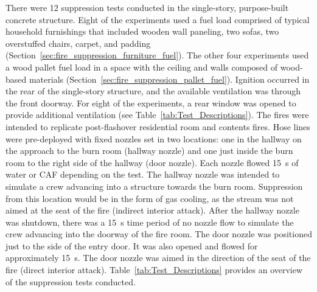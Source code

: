 \documentclass[12pt,oneside]{book}
\begin{document}
There were 12 suppression tests conducted in the single-story, purpose-built concrete structure. Eight of the experiments used a fuel load comprised of typical household furnishings that included wooden wall paneling, two sofas, two overstuffed chairs, carpet, and padding (Section~\ref{sec:fire_suppression_furniture_fuel}). The other four experiments used a wood pallet fuel load in a space with the ceiling and walls composed of wood-based materials (Section~\ref{sec:fire_suppression_pallet_fuel}). Ignition occurred in the rear of the single-story structure, and the available ventilation was through the front doorway. For eight of the experiments, a rear window was opened to provide additional ventilation (see Table~\ref{tab:Test_Descriptions}). The fires were intended to replicate post-flashover residential room and contents fires. Hose lines were pre-deployed with fixed nozzles set in two locations: one in the hallway on the approach to the burn room (hallway nozzle) and one just inside the burn room to the right side of the hallway (door nozzle). Each nozzle flowed 15~s of water or CAF depending on the test. The hallway nozzle was intended to simulate a crew advancing into a structure towards the burn room. Suppression from this location would be in the form of gas cooling, as the stream was not aimed at the seat of the fire (indirect interior attack).  After the hallway nozzle was shutdown, there was a 15~s time period of no nozzle flow to simulate the crew advancing into the doorway of the fire room. The door nozzle was positioned just to the side of the entry door.  It was also opened and flowed for approximately 15~s. The door nozzle was aimed in the direction of the seat of the fire (direct interior attack). Table~\ref{tab:Test_Descriptions} provides an overview of the suppression tests conducted.
\end{document}
